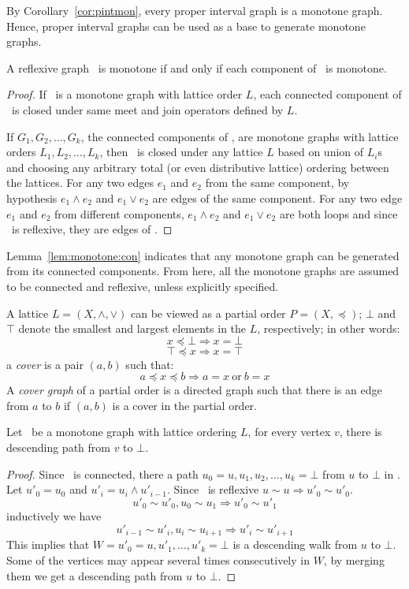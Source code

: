 By Corollary~\ref{cor:pintmon}, every proper interval graph is a monotone graph.
Hence, proper interval graphs can be used as a base to generate monotone graphs.

\begin{lemma} \label{lem:monotone:con}
A reflexive graph \mG\ is monotone if and only if each component of \mG\ is monotone.
\end{lemma}

\begin{proof}
If \mG\ is a monotone graph with lattice order \(L\), each connected component of \mG\ is
closed under same meet and join operators defined by \(L\)\@.

If \(G_1,G_2,\dotsc,G_k\), the connected components of \mG, are
monotone graphs with lattice orders \(L_1,L_2,\dotsc,L_k\),
then \mG\ is closed under any lattice \(L\) based on union of \(L_i\)s
and choosing any arbitrary total (or even distributive lattice) ordering between the
lattices. For any two edges \(e_1\) and \(e_2\) from the same component,
by hypothesis \(e_1\wedge e_2\) and \(e_1\vee e_2\) are
edges of the same component.
For any two edge \(e_1\) and \(e_2\) from different components,
\(e_1\wedge e_2\) and \(e_1\vee e_2\) are both loops and since \mG\ is reflexive,
they are edges of \mG\@.
\end{proof}

Lemma~\ref{lem:monotone:con} indicates that any monotone graph can be generated
from its connected components. From here, all the monotone graphs are
assumed to be connected and reflexive, unless explicitly specified.

A lattice \(L=(X,\wedge,\vee)\) can be viewed as a partial order \(P=(X,\preceq)\);
\(\bot\) and \(\top\) denote the smallest and largest elements in the \(L\), 
respectively; in other words:
\[x \preceq \bot \Rightarrow x = \bot \]
\[\top \preceq x \Rightarrow x = \top \]
a \emph{cover} is a pair \((a,b)\) such that:
\[a \preceq x \preceq b \Rightarrow a = x\ \mathrm{or}\ b = x\]
A \emph{cover graph} of a partial order is a directed graph such that there is
an edge from \(a\) to \(b\) if \((a,b)\) is a cover in the partial order.

\begin{lemma}
Let \mG\ be a monotone graph with lattice ordering \(L\),
for every vertex \(v\), there is descending path from
\(v\) to \(\bot\)\@.
\end{lemma}

\begin{proof}
Since \mG\ is connected, there a path \(u_0=u,u_1,u_2,\dotsc,u_k=\bot\) from \(u\) to 
\(\bot\) in \mG\@. Let \(u'_0=u_0\) and \(u'_i = u_i\wedge u'_{i-1}\)\@.
Since \mG\ is reflexive \(u\sim u \Rightarrow u'_0\sim u'_0\)\@.
\[u'_0\sim u'_0, u_0\sim u_1 \Rightarrow u'_0\sim u'_1\]
inductively we have
\[u'_{i-1}\sim u'_i, u_i\sim u_{i+1} \Rightarrow u'_i\sim u'_{i+1} \]
This implies that \(W=u'_0=u,u'_1,\dotsc,u'_k=\bot\) is a descending walk from 
\(u\) to \(\bot\)\@. Some of the vertices may appear several times consecutively in \(W\),
by merging them we get a descending path from \(u\) to \(\bot\)\@.
\end{proof}

